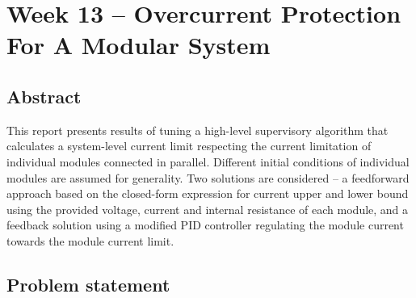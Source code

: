 

\chapter{Week 13 -- Overcurrent Protection For A Modular System}

\section{Abstract}
This report presents results of tuning a high-level supervisory algorithm that calculates a system-level current limit respecting the current limitation of individual modules connected in parallel. Different initial conditions of individual modules are assumed for generality. Two solutions are considered -- a feedforward approach based on the closed-form expression for current upper and lower bound using the provided voltage, current and internal resistance of each module, and a feedback solution using a modified PID controller regulating the module current towards the module current limit. 


\section{Problem statement}



